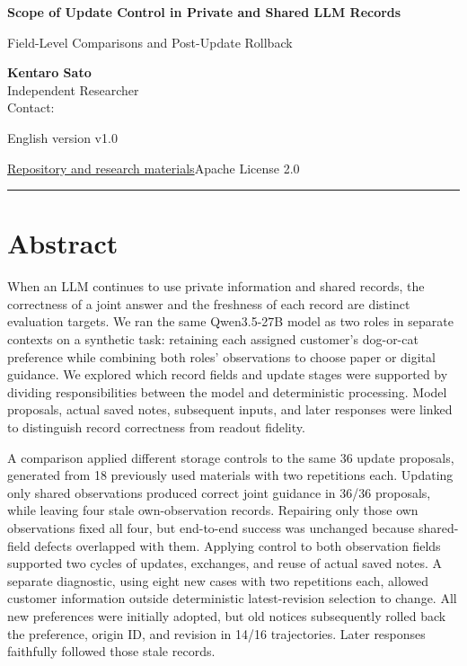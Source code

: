 \documentclass[10pt,a4paper]{article}
\begin{document}
\fontsize{10.7}{15.3}\selectfont\thispagestyle{first}
{\raggedright\sffamily\bfseries\color{ink}\fontsize{22}{27}\selectfont Scope of Update Control in Private and Shared LLM Records\par}

{\raggedright\sffamily\fontsize{13}{17}\selectfont\color{accent} Field-Level Comparisons and Post-Update Rollback\par}

{\small \textbf{Kentaro Sato}\\
Independent Researcher\\
Contact: \texttt{}

English version v1.0\par}
{\small \href{https://github.com/metaSATOKEN/MRSI/tree/9443de315d283874df0c27e0e99b8c04f400709d}{Repository and research materials}\quad\textbar\quad Apache License 2.0\par}\smallskip\hrule\medskip

\section{Abstract}\label{paper-02-abstract}

When an LLM continues to use private information and shared records, the correctness of a joint answer and the freshness of each record are distinct evaluation targets. We ran the same Qwen3.5-27B model as two roles in separate contexts on a synthetic task: retaining each assigned customer's dog-or-cat preference while combining both roles' observations to choose paper or digital guidance. We explored which record fields and update stages were supported by dividing responsibilities between the model and deterministic processing. Model proposals, actual saved notes, subsequent inputs, and later responses were linked to distinguish record correctness from readout fidelity.

A comparison applied different storage controls to the same 36 update proposals, generated from 18 previously used materials with two repetitions each. Updating only shared observations produced correct joint guidance in 36/36 proposals, while leaving four stale own-observation records. Repairing only those own observations fixed all four, but end-to-end success was unchanged because shared-field defects overlapped with them. Applying control to both observation fields supported two cycles of updates, exchanges, and reuse of actual saved notes. A separate diagnostic, using eight new cases with two repetitions each, allowed customer information outside deterministic latest-revision selection to change. All new preferences were initially adopted, but old notices subsequently rolled back the preference, origin ID, and revision in 14/16 trajectories. Later responses faithfully followed those stale records.
\end{document}
